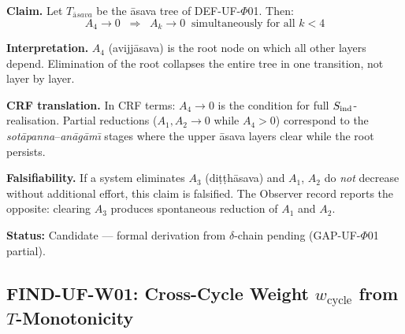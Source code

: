 \documentclass[12pt, a4paper]{article}
\providecommand{\Tasava}{T_{\bar{\mathrm{a}}sava}}
\providecommand{\wcyc}{w_{\mathrm{cycle}}}
\providecommand{\Tasava}{\mathcal{T}_{\!\mathrm{\bar{a}sava}}}
\begin{document}

\begin{formalbox}[title={CLM-UF-$\Phi$01: Root Collapse
  (Candidate Claim)}]
\textbf{Claim.}
Let $\Tasava$ be the \={a}sava tree of DEF-UF-$\Phi$01.
Then:
\[
  A_4 \to 0
  \;\;\Longrightarrow\;\;
  A_k \to 0 \;\;\text{simultaneously for all } k < 4
\]

\textbf{Interpretation.}
$A_4$ (avijj\={a}sava) is the root node on which all other layers
depend. Elimination of the root collapses the entire tree in one
transition, not layer by layer.

\textbf{CRF translation.}
In CRF terms: $A_4 \to 0$ is the condition for full
$S_{\rm ind}$-realisation. Partial reductions
($A_1, A_2 \to 0$ while $A_4 > 0$) correspond to the
\textit{sot\={a}panna}--\textit{an\={a}g\={a}m\={\i}} stages
where the upper \={a}sava layers clear while the root persists.

\textbf{Falsifiability.}
If a system eliminates $A_3$ (di\d{t}\d{t}h\={a}sava) and $A_1$,
$A_2$ do \emph{not} decrease without additional effort, this claim
is falsified. The Observer record reports the opposite: clearing
$A_3$ produces spontaneous reduction of $A_1$ and $A_2$.

\textbf{Status:} Candidate --- formal derivation from
$\delta$-chain pending (GAP-UF-$\Phi$01 partial).
\end{formalbox}

\subsection{FIND-UF-W01: Cross-Cycle Weight \texorpdfstring{$\wcyc$}{wcyc} from \texorpdfstring{$T$}{T}-Monotonicity}

\end{document}
